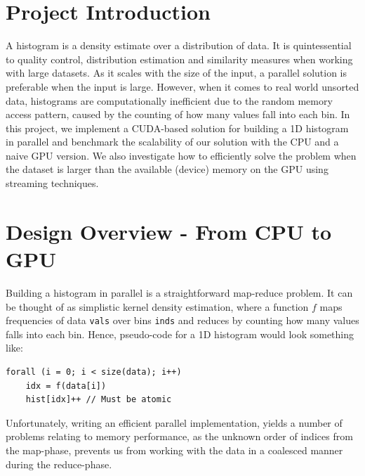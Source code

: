 \documentclass[12pt, a4paper, hidelinks]{article}
\renewcommand{\tt}[1]{\texttt{#1}}
\begin{document}

\tableofcontents
\newpage

\section{Project Introduction}
A histogram is a density estimate over a distribution of data.
It is quintessential to quality control, distribution estimation
and similarity measures when working with large datasets.
As it scales with the size of the input,
a parallel solution is preferable when the input is large.
However, when it comes to real world unsorted data,
histograms are computationally inefficient
due to the random memory access pattern, caused by
the counting of how many values fall into each bin.
In this project, we implement a CUDA-based solution for building a 1D histogram
in parallel and benchmark the scalability of our solution with
the CPU and a naive GPU version.
We also investigate how to efficiently solve the problem when the dataset
is larger than the available (device) memory on the GPU
using streaming techniques.

\section{Design Overview - From CPU to GPU}
Building a histogram in parallel is a straightforward map-reduce problem.
It can be thought of as simplistic kernel density estimation,
where a function $f$ maps frequencies of data \tt{vals} over bins \tt{inds}
and reduces by counting how many values falls into each bin.
Hence, pseudo-code for a 1D histogram would look something like:

\begin{verbatim}
forall (i = 0; i < size(data); i++)
    idx = f(data[i])
    hist[idx]++ // Must be atomic
\end{verbatim}

Unfortunately, writing an efficient parallel implementation,
yields a number of problems relating to memory performance,
as the unknown order of indices from the map-phase,
prevents us from working with the data in a coalesced
manner during the reduce-phase.
\end{document}
